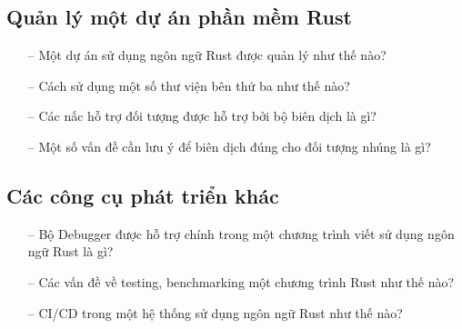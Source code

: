 \subsection{Quản lý một dự án phần mềm Rust}
\begin{itemize}
    \item[--]Một dự án sử dụng ngôn ngữ Rust được quản lý như thế nào?
    \item[--]Cách sử dụng một số thư viện bên thứ ba như thế nào?
    \item[--]Các nấc hỗ trợ đối tượng được hỗ trợ bởi bộ biên dịch là gì?
    \item[--]Một số vấn đề cần lưu ý để biên dịch đúng cho đối tượng nhúng là gì?
\end{itemize}

\subsection{Các công cụ phát triển khác}
\begin{itemize}
    \item[--] Bộ Debugger được hỗ trợ chính trong một chương trình viết sử dụng ngôn ngữ Rust là gì?
    \item[--] Các vấn đề về testing, benchmarking một chương trình Rust như thế nào?
    \item[--] CI/CD trong một hệ thống sử dụng ngôn ngữ Rust như thế nào?
\end{itemize}

